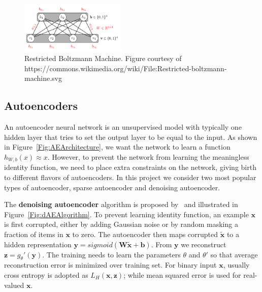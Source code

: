 \begin{figure}[h]
    \centering
    \includegraphics[width=0.45\textwidth]{figures/rbm.png}
    \caption{Restricted Boltzmann Machine.
        Figure courtesy of https://commons.wikimedia.org/wiki/File:Restricted-boltzmann-machine.svg}
    \label{Fig:RBMArchitecture}
\end{figure}



\subsection{Autoencoders}
An autoencoder neural network is an unsupervised model with typically one hidden layer that
tries to set the output layer to be equal to the input.
As shown in Figure~\ref{Fig:AEArchitecture}, we want the network to
learn a function $h_{W, b}(x) \approx x$.
However, to prevent the network from learning the meaningless identity function,
we need to place extra constraints on the network, giving birth to different
flavors of autoencoders.
In this project we consider two most popular types of autoencoder, sparse autoencoder and
denoising autoencoder.

The \textbf{denoising autoencoder} algorithm is proposed by~\cite{DenoiseAE} and illustrated in
Figure~\ref{Fig:dAEAlgorithm}.
To prevent learning identity function, an example $\mathbf{x}$ is first corrupted, either by
adding Gaussian noise or by random masking a fraction of items in $\mathbf{x}$ to zero.
The autoencoder then maps corrupted $\mathbf{\tilde{x}}$ to a hidden representation $\mathbf{y} = sigmoid(\mathbf{W}\tilde{\mathbf{x}} + \mathbf{b})$.
From $\mathbf{y}$ we reconstruct $\mathbf{z}=g_\theta'(\mathbf{y})$.
The training needs to learn the parameters $\theta$ and $\theta'$ so that
average reconstruction error is minimized over training set.
For binary input $\mathbf{x}$, usually cross entropy is adopted as $L_H(\mathbf{x}, \mathbf{z})$;
while mean squared error is used for real-valued $\mathbf{x}$.


